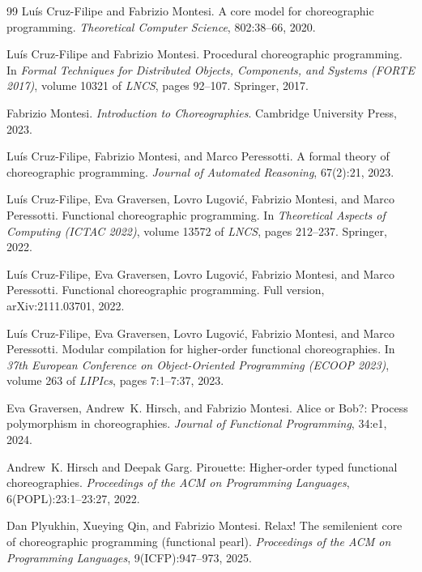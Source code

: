 \documentclass[11pt]{report}
\theoremstyle{plain}
\theoremstyle{definition}
\theoremstyle{remark}
\begin{document}
\begin{thebibliography}{99}
Lu\'is Cruz-Filipe and Fabrizio Montesi.
\newblock A core model for choreographic programming.
\newblock \emph{Theoretical Computer Science}, 802:38--66, 2020.

Lu\'is Cruz-Filipe and Fabrizio Montesi.
\newblock Procedural choreographic programming.
\newblock In \emph{Formal Techniques for Distributed Objects, Components,
  and Systems (FORTE 2017)}, volume 10321 of \emph{LNCS}, pages 92--107.
  Springer, 2017.

Fabrizio Montesi.
\newblock \emph{Introduction to Choreographies}.
\newblock Cambridge University Press, 2023.

Lu\'is Cruz-Filipe, Fabrizio Montesi, and Marco Peressotti.
\newblock A formal theory of choreographic programming.
\newblock \emph{Journal of Automated Reasoning}, 67(2):21, 2023.

Lu\'is Cruz-Filipe, Eva Graversen, Lovro Lugovi\'c, Fabrizio Montesi, and
  Marco Peressotti.
\newblock Functional choreographic programming.
\newblock In \emph{Theoretical Aspects of Computing (ICTAC 2022)}, volume
  13572 of \emph{LNCS}, pages 212--237. Springer, 2022.

Lu\'is Cruz-Filipe, Eva Graversen, Lovro Lugovi\'c, Fabrizio Montesi, and
  Marco Peressotti.
\newblock Functional choreographic programming.
\newblock Full version, arXiv:2111.03701, 2022.

Lu\'is Cruz-Filipe, Eva Graversen, Lovro Lugovi\'c, Fabrizio Montesi, and
  Marco Peressotti.
\newblock Modular compilation for higher-order functional choreographies.
\newblock In \emph{37th European Conference on Object-Oriented Programming
  (ECOOP 2023)}, volume 263 of \emph{LIPIcs}, pages 7:1--7:37, 2023.

Eva Graversen, Andrew~K. Hirsch, and Fabrizio Montesi.
\newblock Alice or {B}ob?: Process polymorphism in choreographies.
\newblock \emph{Journal of Functional Programming}, 34:e1, 2024.

Andrew~K. Hirsch and Deepak Garg.
\newblock Pirouette: Higher-order typed functional choreographies.
\newblock \emph{Proceedings of the ACM on Programming Languages}, 6(POPL):23:1--23:27, 2022.

Dan Plyukhin, Xueying Qin, and Fabrizio Montesi.
\newblock Relax! {T}he semilenient core of choreographic programming
  (functional pearl).
\newblock \emph{Proceedings of the ACM on Programming Languages},
  9(ICFP):947--973, 2025.


\end{thebibliography}
\end{document}

